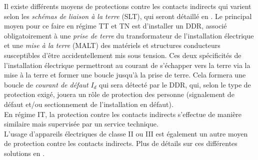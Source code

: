 Il existe différents moyens de protections contre les contacts indirects qui varient selon les \emph{schémas de liaison à la terre} (SLT), qui seront détaillé en . Le principal moyen pour ce faire en régime TT et TN est d'installer un DDR, associé obligatoirement à une \emph{prise de terre} du transformateur de l'installation électrique et une \emph{mise à la terre} (MALT) des matériels et structures conducteurs susceptibles d'être accidentellement mis sous tension. Ces deux spécificités de l'installation électrique permettront au courant de s'échapper vers la terre via la mise à la terre et former une boucle jusqu'à la prise de terre. Cela formera une boucle de \emph{courant de défaut} $I_d$ qui sera détecté par le DDR, qui, selon le type de protection exigé, jouera un rôle de protection des personne (signalement de défaut et/ou sectionnement de l'installation en défaut).\\
En régime IT, la protection contre les contacts indirects s'effectue de manière similaire mais supervisée par un service technique.\\

L'usage d'appareils électriques de classe II ou III est également un autre moyen de protection contre les contacts indirects. Plus de détails sur ces différentes solutions en . 

%
